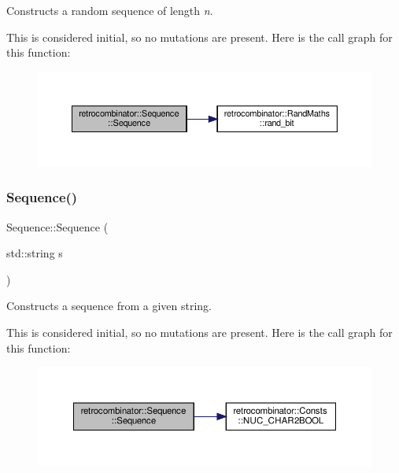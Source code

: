 Constructs a random sequence of length {\itshape n}. 

This is considered initial, so no mutations are present. Here is the call graph for this function\+:\nopagebreak
\begin{figure}[H]
\begin{center}
\leavevmode
\includegraphics[width=350pt]{classretrocombinator_1_1Sequence_a04d0d6977316f2ab30844e584c4531ec_cgraph}
\end{center}
\end{figure}
\mbox{\label{classretrocombinator_1_1Sequence_af5b3b62eba07f0e09f532fcf1681c289}} 
\subsubsection{\texorpdfstring{Sequence()}{Sequence()}\hspace{0.1cm}{\footnotesize\ttfamily [2/3]}}
{\footnotesize\ttfamily Sequence\+::\+Sequence (\begin{DoxyParamCaption}\item[{std\+::string}]{s }\end{DoxyParamCaption})}



Constructs a sequence from a given string. 

This is considered initial, so no mutations are present. Here is the call graph for this function\+:\nopagebreak
\begin{figure}[H]
\begin{center}
\leavevmode
\includegraphics[width=350pt]{classretrocombinator_1_1Sequence_af5b3b62eba07f0e09f532fcf1681c289_cgraph}
\end{center}
\end{figure}
\mbox{\label{classretrocombinator_1_1Sequence_af334c44bea806196b5037e61b0e831b1}} 
